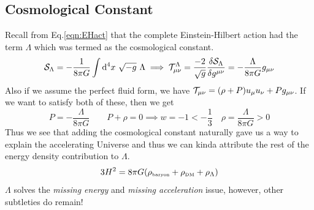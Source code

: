 \subsection{Cosmological Constant}
Recall from Eq.\ref{eqn:EHact} that the complete Einstein-Hilbert action had the term $\Lambda$ which was termed as the cosmological constant. 
$$\Ss_\Lambda =-\frac{1}{8\pi G} \int\dd^4x \ \sqrt{-g} \ \Lambda \implies \ST^{\Lambda}_{\mu\nu} = \frac{-2}{\sqrt{g}} \fdv{\Ss_\Lambda}{g^{\mu\nu}} =-\frac{\Lambda}{8 \pi G}g_{\mu\nu}$$
Also if we assume the perfect fluid form, we have $\mathcal T_{\mu\nu} = (\rho+P)u_\mu u_\nu + Pg_{\mu\nu}$. If we want to satisfy both of these, then we get 
$$\boxed{P = -\frac{\Lambda}{8\pi G}} \qquad \boxed{P+\rho =0}\implies w=-1 <-\frac{1}{3} \quad \rho = \frac{\Lambda}{8\pi G}>0$$
Thus we see that adding the cosmological constant naturally gave us a way to explain the accelerating Universe and thus we can kinda attribute the rest of the energy density contribution to $\Lambda$. 
$$3H^2 = 8\pi G(\rho_{\text{\tiny baryon}}+ \rho_{\text{\tiny DM}}+\rho_\Lambda)$$
$\Lambda$ solves the \textit{missing energy} and \textit{missing acceleration} issue, however, other subtleties do remain!